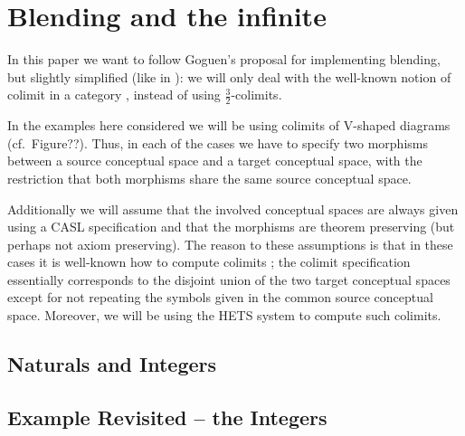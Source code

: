 \section{Blending and the infinite}
\label{sec:infinity}



In this paper we want to follow Goguen's proposal \cite{Go99c} for
implementing blending, but slightly simplified (like in
\cite{KuMoHoBhBa12}): we will only deal with
the well-known notion of colimit in a category \cite{Gog91}, instead of
using $\frac{3}{2}$-colimits.

In the examples here considered we will be using colimits of V-shaped
diagrams (cf.~Figure??). Thus, in each of the cases we have to specify
two morphisms between a source conceptual space and a target conceptual
space, with the restriction that both morphisms share the same source
conceptual space.

Additionally we will assume that the involved conceptual spaces are
always given using a
CASL specification \cite{MoHaSaTa08} and that the morphisms are theorem
preserving (but perhaps not axiom preserving). The reason to these
assumptions
is that in these cases it is well-known how to compute colimits
\cite{Mo98a}; the colimit specification essentially corresponds to the
disjoint union of the two target conceptual spaces except for not
repeating the symbols given in the common source conceptual space.
Moreover, we will be using 
the HETS system \parencite{MossakowskiEA06} to compute such colimits.



\subsection{Naturals and Integers}

\subsection{Example Revisited -- the Integers}

